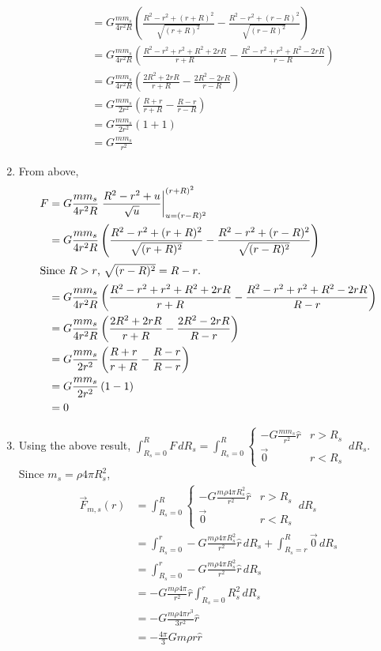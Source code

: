 \documentclass[solutions]{esg8012pset}
\renewcommand{\d}{\,d}
\begin{document}
\begin{enumerate}[1)]
\begin{align*}
     & = G \frac{m m_s}{4r^2R} \left(\frac{R^2 - r^2 + (r+R)^2}{\sqrt{(r+R)^2}} - \frac{R^2 - r^2 + (r-R)^2}{\sqrt{(r-R)^2}}\right) \\
     & = G \frac{m m_s}{4r^2R} \left(\frac{R^2 - r^2 + r^2 + R^2 + 2rR}{r+R} - \frac{R^2 - r^2 + r^2 + R^2 -2rR}{r-R}\right) \\
     & = G \frac{m m_s}{4r^2R} \left(\frac{2R^2 + 2rR}{r+R} - \frac{2R^2 - 2rR}{r-R}\right) \\
     & = G \frac{m m_s}{2r^2} \left(\frac{R + r}{r+R} - \frac{R - r}{r-R}\right) \\
     & = G \frac{m m_s}{2r^2} \left(1 + 1\right) \\
     & = G \frac{m m_s}{r^2}
    \end{align*}
    \item From above, \begin{align*}
     F & = G \frac{m m_s}{4r^2R} \left.\frac{R^2 - r^2 + u}{\sqrt{u}}\right|_{u = (r-R)^2}^{(r+R)^2} \\
     & = G \frac{m m_s}{4r^2R} \left(\frac{R^2 - r^2 + (r+R)^2}{\sqrt{(r+R)^2}} - \frac{R^2 - r^2 + (r-R)^2}{\sqrt{(r-R)^2}}\right) \\
     \intertext{Since $R>r$, $\sqrt{(r-R)^2} = R - r$.}
     & = G \frac{m m_s}{4r^2R} \left(\frac{R^2 - r^2 + r^2 + R^2 + 2rR}{r+R} - \frac{R^2 - r^2 + r^2 + R^2 -2rR}{R - r}\right) \\
     & = G \frac{m m_s}{4r^2R} \left(\frac{2R^2 + 2rR}{r+R} - \frac{2R^2 - 2rR}{R - r}\right) \\
     & = G \frac{m m_s}{2r^2} \left(\frac{R + r}{r+R} - \frac{R - r}{R - r}\right) \\
     & = G \frac{m m_s}{2r^2} \left(1 - 1\right) \\
     & = 0
    \end{align*}
    \item Using the above result, $\displaystyle \int_{R_s=0}^{R} F\d{R_s} = \int_{R_s=0}^{R} \begin{cases} -G\frac{mm_s}{r^2}\hat r & r > R_s \\ \vec 0 & r < R_s\end{cases} \d{R_s}$.  Since $m_s = \rho 4\pi R_s^2$, \begin{align*}
     \vec F_{m,s}(r) & =  \int_{R_s=0}^{R} \begin{cases} -G\frac{m \rho 4\pi R_s^2 }{r^2}\hat r & r > R_s \\ \vec 0 & r < R_s\end{cases} \d{R_s} \\
     & = \int_{R_s=0}^{r} -G\frac{m \rho 4\pi R_s^2 }{r^2}\hat r \d{R_s} + \int_{R_s=r}^{R} \vec 0 \d{R_s} \\
     & = \int_{R_s=0}^{r} -G\frac{m \rho 4\pi R_s^2 }{r^2}\hat r \d{R_s} \\
     & = -G\frac{m \rho 4\pi}{r^2}\hat r \int_{R_s=0}^{r} R_s^2 \d{R_s} \\
     & = -G\frac{m \rho 4\pi r^3}{3 r^2}\hat r \\
     & = -\frac{4\pi}{3}G m \rho r\hat r
    \end{align*}
  \end{enumerate}
\end{document}
